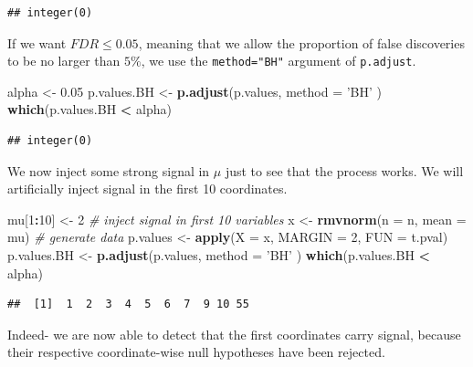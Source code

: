 \documentclass[]{book}
\newenvironment{Shaded}{\begin{snugshade}}{\end{snugshade}}
\newcommand{\KeywordTok}[1]{\textcolor[rgb]{0.13,0.29,0.53}{\textbf{#1}}}
\newcommand{\DataTypeTok}[1]{\textcolor[rgb]{0.13,0.29,0.53}{#1}}
\newcommand{\DecValTok}[1]{\textcolor[rgb]{0.00,0.00,0.81}{#1}}
\newcommand{\FloatTok}[1]{\textcolor[rgb]{0.00,0.00,0.81}{#1}}
\newcommand{\StringTok}[1]{\textcolor[rgb]{0.31,0.60,0.02}{#1}}
\newcommand{\CommentTok}[1]{\textcolor[rgb]{0.56,0.35,0.01}{\textit{#1}}}
\newcommand{\OperatorTok}[1]{\textcolor[rgb]{0.81,0.36,0.00}{\textbf{#1}}}
\newcommand{\NormalTok}[1]{#1}
\theoremstyle{definition}
\theoremstyle{definition}
\theoremstyle{definition}
\theoremstyle{remark}
\begin{document}
\begin{verbatim}
## integer(0)
\end{verbatim}

If we want \(FDR \leq 0.05\), meaning that we allow the proportion of
false discoveries to be no larger than \(5\%\), we use the
\texttt{method="BH"} argument of \texttt{p.adjust}.

\begin{Shaded}
\begin{Highlighting}[]
\NormalTok{alpha <-}\StringTok{ }\FloatTok{0.05}
\NormalTok{p.values.BH <-}\StringTok{ }\KeywordTok{p.adjust}\NormalTok{(p.values, }\DataTypeTok{method =} \StringTok{'BH'}\NormalTok{ )}
\KeywordTok{which}\NormalTok{(p.values.BH }\OperatorTok{<}\StringTok{ }\NormalTok{alpha)}
\end{Highlighting}
\end{Shaded}

\begin{verbatim}
## integer(0)
\end{verbatim}

We now inject some strong signal in \(\mu\) just to see that the process
works. We will artificially inject signal in the first 10 coordinates.

\begin{Shaded}
\begin{Highlighting}[]
\NormalTok{mu[}\DecValTok{1}\OperatorTok{:}\DecValTok{10}\NormalTok{] <-}\StringTok{ }\DecValTok{2} \CommentTok{# inject signal in first 10 variables}
\NormalTok{x <-}\StringTok{ }\KeywordTok{rmvnorm}\NormalTok{(}\DataTypeTok{n =}\NormalTok{ n, }\DataTypeTok{mean =}\NormalTok{ mu) }\CommentTok{# generate data}
\NormalTok{p.values <-}\StringTok{ }\KeywordTok{apply}\NormalTok{(}\DataTypeTok{X =}\NormalTok{ x, }\DataTypeTok{MARGIN =} \DecValTok{2}\NormalTok{, }\DataTypeTok{FUN =}\NormalTok{ t.pval) }
\NormalTok{p.values.BH <-}\StringTok{ }\KeywordTok{p.adjust}\NormalTok{(p.values, }\DataTypeTok{method =} \StringTok{'BH'}\NormalTok{ )}
\KeywordTok{which}\NormalTok{(p.values.BH }\OperatorTok{<}\StringTok{ }\NormalTok{alpha)}
\end{Highlighting}
\end{Shaded}

\begin{verbatim}
##  [1]  1  2  3  4  5  6  7  9 10 55
\end{verbatim}

Indeed- we are now able to detect that the first coordinates carry
signal, because their respective coordinate-wise null hypotheses have
been rejected.
\end{document}
